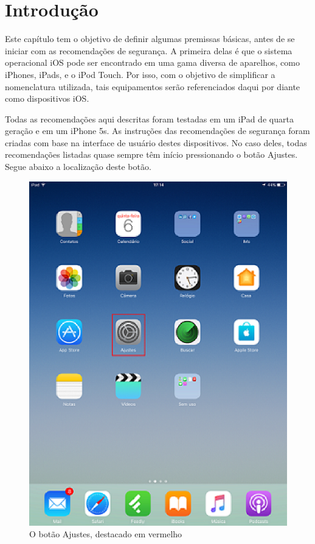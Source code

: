 \chapter{Introdu\c c\~ao}

Este cap\'itulo tem o objetivo de definir algumas premissas b\'asicas, antes de se iniciar com as recomenda\c c\~oes de seguran\c ca. A primeira delas \'e que o sistema operacional iOS pode ser encontrado em uma gama diversa de aparelhos, como iPhones, iPads, e o iPod Touch. Por isso, com o objetivo de simplificar a nomenclatura utilizada, tais equipamentos ser\~ao referenciados daqui por diante como dispositivos iOS. 

Todas as recomenda\c c\~oes aqui descritas foram testadas em um iPad de quarta gera\c c\~ao e em um iPhone 5s. As instru\c c\~oes das recomenda\c c\~oes de seguran\c ca foram criadas com base na interface de usu\'ario destes dispositivos. No caso deles, todas recomenda\c c\~oes listadas quase sempre t\^em in\'icio pressionando o bot\~ao Ajustes. Segue abaixo a localiza\c c\~ao deste bot\~ao.

\begin{figure}[h]
  \centering
  \includegraphics{imagem4.eps}
  \caption{O bot\~ao Ajustes, destacado em vermelho}
\end{figure}

